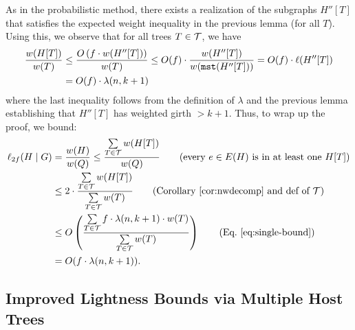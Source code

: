 As in the probabilistic method, there exists a realization of the subgraphs $H''[T]$ that satisfies the expected weight inequality in the previous lemma (for all $T$).
Using this, we observe that for all trees $T \in \mathcal{T}$, we have 
\begin{align}
\frac{w(H[T])}{w(T)} &\le \frac{O\left(f \cdot w(H''[T])\right)}{w(T)} \le O(f) \cdot \frac{w(H''[T])}{w(\texttt{mst}(H''[T]))} = O(f) \cdot \ell(H''[T]) \notag \\ 
&= O(f) \cdot \lambda(n, k+1) \label{eq:single-bound}
\end{align}
where the last inequality follows from the definition of $\lambda$ and the previous lemma establishing that $H''[T]$ has weighted girth $>k+1$.
Thus, to wrap up the proof, we bound:
\begin{align*}
\ell_{2f}(H \mid G) &= \frac{w(H)}{w(Q)} \leq \frac{\sum \limits_{T \in \tee} w(H[T])}{w(Q)} \tag{every $e \in E(H)$ is in at least one $H[T]$} \\ 
&\leq 2 \cdot \frac{\sum \limits_{T \in \tee} w(H[T])}{\sum \limits_{T \in \tee} w(T)} \tag{Corollary~\ref{cor:nwdecomp} and def of $\tee$}\\
&\le  O\left( \frac{\sum \limits_{T \in \tee} f \cdot \lambda(n, k+1) \cdot w(T)}{\sum \limits_{T \in \tee} w(T)} \right) \tag{Eq.~\eqref{eq:single-bound}}\\
&= O(f \cdot \lambda(n, k+1)).
\end{align*}

\subsection{Improved Lightness Bounds via Multiple Host Trees} \label{sec:multiple-host}

